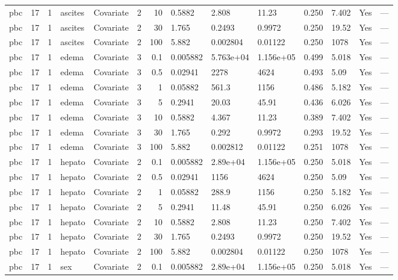\begin{tabular}{lrlllrrlllllll}
  pbc & 17 & 1 & ascites & Covariate & 2 &    10 & 0.5882 & 2.808 & 11.23 & 0.250 & 7.402 & Yes & --- \\ 
  pbc & 17 & 1 & ascites & Covariate & 2 &    30 & 1.765 & 0.2493 & 0.9972 & 0.250 & 19.52 & Yes & --- \\ 
  pbc & 17 & 1 & ascites & Covariate & 2 &   100 & 5.882 & 0.002804 & 0.01122 & 0.250 & 1078 & Yes & --- \\ 
  pbc & 17 & 1 & edema & Covariate & 3 &   0.1 & 0.005882 & 5.763e+04 & 1.156e+05 & 0.499 & 5.018 & Yes & --- \\ 
  pbc & 17 & 1 & edema & Covariate & 3 &   0.5 & 0.02941 & 2278 & 4624 & 0.493 & 5.09 & Yes & --- \\ 
  pbc & 17 & 1 & edema & Covariate & 3 &     1 & 0.05882 & 561.3 & 1156 & 0.486 & 5.182 & Yes & --- \\ 
  pbc & 17 & 1 & edema & Covariate & 3 &     5 & 0.2941 & 20.03 & 45.91 & 0.436 & 6.026 & Yes & --- \\ 
  pbc & 17 & 1 & edema & Covariate & 3 &    10 & 0.5882 & 4.367 & 11.23 & 0.389 & 7.402 & Yes & --- \\ 
  pbc & 17 & 1 & edema & Covariate & 3 &    30 & 1.765 & 0.292 & 0.9972 & 0.293 & 19.52 & Yes & --- \\ 
  pbc & 17 & 1 & edema & Covariate & 3 &   100 & 5.882 & 0.002812 & 0.01122 & 0.251 & 1078 & Yes & --- \\ 
  pbc & 17 & 1 & hepato & Covariate & 2 &   0.1 & 0.005882 & 2.89e+04 & 1.156e+05 & 0.250 & 5.018 & Yes & --- \\ 
  pbc & 17 & 1 & hepato & Covariate & 2 &   0.5 & 0.02941 & 1156 & 4624 & 0.250 & 5.09 & Yes & --- \\ 
  pbc & 17 & 1 & hepato & Covariate & 2 &     1 & 0.05882 & 288.9 & 1156 & 0.250 & 5.182 & Yes & --- \\ 
  pbc & 17 & 1 & hepato & Covariate & 2 &     5 & 0.2941 & 11.48 & 45.91 & 0.250 & 6.026 & Yes & --- \\ 
  pbc & 17 & 1 & hepato & Covariate & 2 &    10 & 0.5882 & 2.808 & 11.23 & 0.250 & 7.402 & Yes & --- \\ 
  pbc & 17 & 1 & hepato & Covariate & 2 &    30 & 1.765 & 0.2493 & 0.9972 & 0.250 & 19.52 & Yes & --- \\ 
  pbc & 17 & 1 & hepato & Covariate & 2 &   100 & 5.882 & 0.002804 & 0.01122 & 0.250 & 1078 & Yes & --- \\ 
  pbc & 17 & 1 & sex & Covariate & 2 &   0.1 & 0.005882 & 2.89e+04 & 1.156e+05 & 0.250 & 5.018 & Yes & --- \\ 

\end{tabular}
